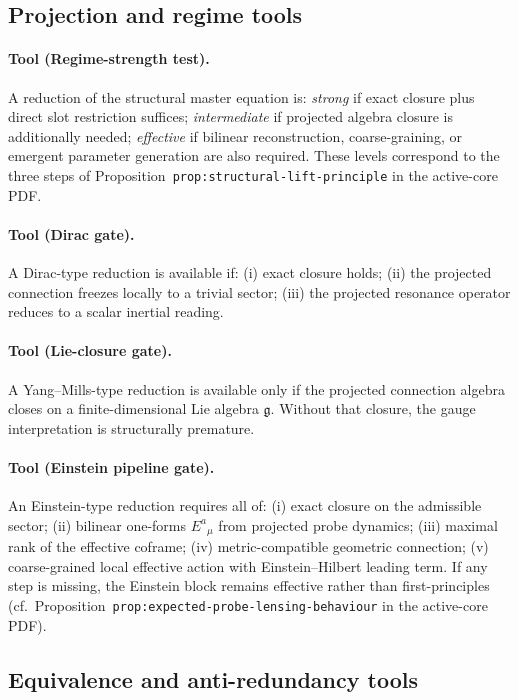\subsection*{Projection and regime tools}

\paragraph{Tool (Regime-strength test).}
A reduction of the structural master equation is: \emph{strong} if
exact closure plus direct slot restriction suffices; \emph{intermediate}
if projected algebra closure is additionally needed; \emph{effective} if
bilinear reconstruction, coarse-graining, or emergent parameter
generation are also required.
These levels correspond to the three steps of
Proposition~\texttt{prop:structural-lift-principle} in the active-core PDF.

\paragraph{Tool (Dirac gate).}
A Dirac-type reduction is available if: (i) exact closure holds;
(ii) the projected connection freezes locally to a trivial sector;
(iii) the projected resonance operator reduces to a scalar inertial
reading.

\paragraph{Tool (Lie-closure gate).}
A Yang--Mills-type reduction is available only if the projected
connection algebra closes on a finite-dimensional Lie algebra
$\mathfrak{g}$. Without that closure, the gauge interpretation is
structurally premature.

\paragraph{Tool (Einstein pipeline gate).}
An Einstein-type reduction requires all of: (i) exact closure on the
admissible sector; (ii) bilinear one-forms $E^a{}_\mu$ from projected
probe dynamics; (iii) maximal rank of the effective coframe; (iv)
metric-compatible geometric connection; (v) coarse-grained local
effective action with Einstein--Hilbert leading term. If any step is
missing, the Einstein block remains effective rather than
first-principles
(cf.\ Proposition~\texttt{prop:expected-probe-lensing-behaviour} in the active-core PDF).

\subsection*{Equivalence and anti-redundancy tools}

